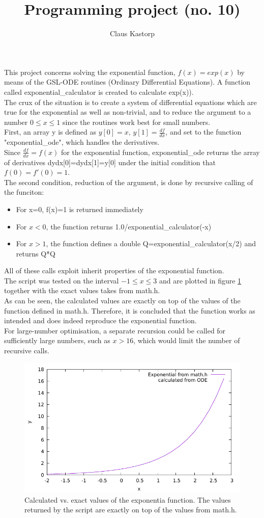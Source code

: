 \documentclass[12pt]{article}
\title{Programming project (no. 10)}
\author{Claus Kastorp}
\begin{document}
\maketitle
This project concerns solving the exponential function, $f(x)=exp(x)$ by means of the GSL-ODE routines (Ordinary Differential Equations). A function called exponential\_calculator is created to calculate exp(x)).\\
The crux of the situation is to create a system of differential equations which are true for the exponential as well as non-trivial, and to reduce the argument to a number $0\leq x\leq 1$ since the routines work best for small numbers.\\
First, an array y is defined as $y[0]=x,\,y[1]=\frac{df}{dx}$, and set to the function "exponential\_ode", which handles the derivatives.\\
Since $\frac{df}{dx}=f(x)$ for the exponential function, exponential\_ode returns the array of derivatives dydx[0]=dydx[1]=y[0] under the initial condition that $f(0)=f'(0)=1$.\\
The second condition, reduction of the argument, is done by recursive calling of the funciton:
\begin{itemize}
\item For x=0, f(x)=1 is returned immediately
\item For $x<0$, the function returns 1.0/exponential\_calculator(-x)
\item For $x>1$, the function defines a double Q=exponential\_calculator(x/2) and returns Q*Q
\end{itemize}
All of these calls exploit inherit properties of the exponential function.\\
The script was tested on the interval $-1\leq x\leq 3$ and are plotted in figure \ref{fig:plot} together with the exact values takes from math.h.
\\
As can be seen, the calculated values are exactly on top of the values of the function defined in math.h. Therefore, it is concluded that the function works as intended and does indeed reproduce the exponential function.\\
For large-number optimisation, a separate recursion could be called for sufficiently large numbers, such as $x>16$, which would limit the number of recursive calls.
\begin{figure}
\includegraphics{plot.pdf}
\caption{Calculated vs. exact values of the exponentia function. The values returned by the script are exactly on top of the values from math.h.}
\label{fig:plot}
\end{figure}
\end{document}
